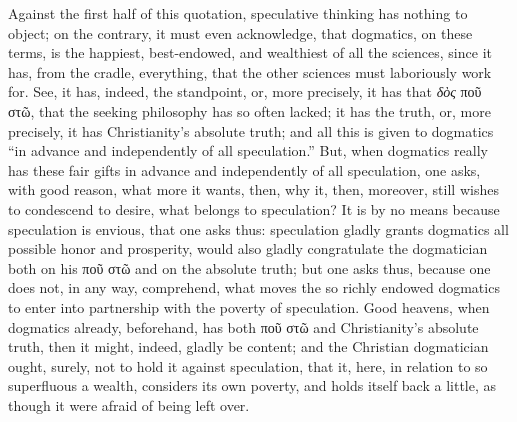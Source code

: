 \documentclass[12pt]{book}
\begin{document}
Against the first half of this quotation, speculative thinking has nothing to object; on the contrary, it
must even acknowledge, that dogmatics, on these terms, is the happiest, best-endowed, and wealthiest of all the sciences, since it has, from the cradle, everything, that the other sciences must laboriously work for. See, it has, indeed, the standpoint, or, more precisely, it has that \textit{δὸς} ποῦ στῶ, that the seeking philosophy has so often lacked; it has the truth, or, more precisely, it has Christianity's absolute truth; and all this is given to dogmatics ``in advance and independently of all speculation.'' But, when dogmatics really has these fair gifts in advance and independently of all speculation, one asks, with good reason, what more it wants, then, why it, then, moreover, still wishes to condescend to desire, what belongs to speculation? It is by no means because speculation is envious, that one asks thus: speculation gladly grants dogmatics all possible honor and prosperity, would also gladly congratulate the dogmatician both on his ποῦ στῶ and on the absolute truth; but one asks thus, because one does not, in any way, comprehend, what moves the so richly endowed
dogmatics to enter into partnership with the poverty of speculation. Good heavens, when dogmatics already, beforehand, has both ποῦ στῶ and Christianity's absolute truth, then it might, indeed, gladly be content; and the Christian dogmatician ought, surely, not to hold it against speculation, that it, here, in relation to so superfluous a wealth, considers its own poverty, and holds itself back a little, as though it were afraid of being left over.
\end{document}
